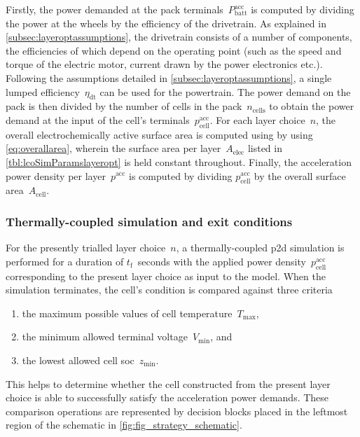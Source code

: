 Firstly, the power demanded  at the pack terminals~$P^\text{acc}_\text{batt}$ is
computed  by  dividing  the  power  at  the wheels  by  the  efficiency  of  the
drivetrain.  As explained  in \cref{subsec:layeroptassumptions},  the drivetrain
consists of  a number  of components,  the efficiencies of  which depend  on the
operating point  (such as the  speed and torque  of the electric  motor, current
drawn  by the  power electronics  etc.). Following  the assumptions  detailed in
\cref{subsec:layeroptassumptions},  a single  lumped efficiency~$\eta_\text{dt}$
can be  used for the powertrain.  The power demand  on the pack is  then divided
by  the  number of  cells  in  the pack~$n_\text{cells}$  to  obtain the  power
demand  at the  input  of the  cell's terminals~$p^\text{acc}_\text{cell}$.  For
each  layer choice~$n$,  the overall  electrochemically active  surface area  is
computed  using by  using \cref{eq:overallarea},  wherein the  surface area  per
layer~$A_\text{elec}$ listed in \cref{tbl:lcoSimParamslayeropt} is held constant
throughout.  Finally, the  acceleration power  density per  layer~$p^\text{acc}$
is  computed  by  dividing  $p^\text{acc}_\text{cell}$ by  the  overall  surface
area~$A_\text{cell}$.

\subsubsection*{Thermally-coupled  simulation and exit
conditions}\label{sec:accexitconditions}

For  the  presently trialled  layer  choice~$n$,  a thermally-coupled  \gls{p2d}
simulation is performed for a duration  of $t_\text{f}$~seconds with the applied
power  density~$p^\text{acc}_\text{cell}$  corresponding  to  the present  layer
choice  as input  to  the  model. When  the  simulation  terminates, the  cell's
condition is compared against three criteria
\begin{enumerate}
    \item the maximum possible values of cell temperature~$T_\text{max}$,
    \item the minimum allowed terminal voltage~$V_\text{min}$, and
    \item the lowest allowed cell \gls{soc}~$z_\text{min}$.
\end{enumerate}
This helps  to determine  whether the  cell constructed  from the  present layer
choice is  able to  successfully satisfy the  acceleration power  demands. These
comparison operations are represented by  decision blocks placed in the leftmost
region of the schematic in \cref{fig:fig_strategy_schematic}.


